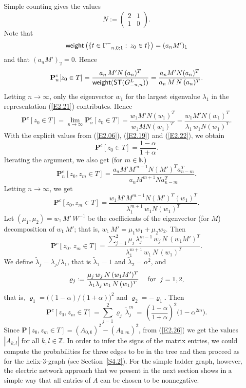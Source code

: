 \documentclass[11pt]{article}
\providecommand{\1}{\mathBB{1}}
\newcommand{\mf}{\quad\mbox{\;for \;}}
\renewcommand{\P}{\mathbf{P}}
\newcommand{\N}{{\mathbb{N}}}
\newcommand{\Z}{{\mathbb{Z}}}
\newcommand{\equ}[1]{(\ref{#1})}
\def\SPT{\mathsf{ST}}
\newcommand{\weight}{\mathop{\mbox{\sf weight}}}
\begin{document}
Simple counting gives the values
\begin{equation}
\label{E2.22}
N:=\left(\begin{array}{cc}
2&1\\
1&0
\end{array}\right).
\end{equation}
Note that
$$\weight\big(\{t\in\Gamma^-_{-n,0;1}:\,z_0\in t\}\big)=(a_{n}M')_1$$
and that $(a_{n}M')_2=0$.
Hence
\begin{equation}
\label{E2.23}
\P^c_n[z_0\in T]=\frac{a_{n}\,M'N\,(a_{n})^T}{\weight(\SPT(G^L_{-n,n}))}
=\frac{a_{n}M'N(a_{n})^T}{a_{n}\,M\,N\,(a_{n})^T}.
\end{equation}
Letting $n\to\infty$, only the eigenvector $w_1$ for the largest eigenvalue $\lambda_1$ in the representation \equ{E2.21} contributes. Hence
\begin{equation}
\label{E2.24}
\P^c[z_0\in T]=\lim_{n\to\infty}\P^c_n[z_0\in T]=\frac{w_1M'N(w_1)^T}{w_1MN(w_1)^T}
=\frac{w_1M'N(w_1)^T}{\lambda_1\,w_1N(w_1)^T}.
\end{equation}
With the explicit values from \equ{E2.06}, \equ{E2.19} and \equ{E2.22}, we obtain
$$\P^c[z_0 \in T]=\frac{1-\alpha}{1+\alpha}.$$
Iterating the argument, we also get (for $m\in \N$)
$$\P^c_n[z_0,z_m\in T]=\frac{a_{n}M'M^{m-1}N(M')^Ta_{n-m}^T}{a_{n}M^{m+1}Na_{n-m}^T}.$$
Letting $n\to\infty$, we get
\begin{equation}
\label{E2.25}
\P^c[z_0,z_m\in T]=\frac{w_1M'M^{m-1}N(M')^T(w_1)^T}{\lambda_1^{m+1}\,w_1N(w_1)^T}.
\end{equation}
Let $(\mu_1,\mu_2)=w_1\,M'\,W^{-1}$
be the coefficients of the eigenvector (for $M$) decomposition of $w_1\,M'$; that is, $w_1\,M'=\mu_1w_1+\mu_2w_2$. Then
$$\P^c[z_0,\,z_m\in T]=\frac{\sum_{j=1}^2\mu_j\,\lambda_j^{m-1}\,w_j\,N\,(w_1M')^T}{\lambda_1^{m+1}\,w_1\,N\,(w_1)^T}.$$
We define
$\tilde\lambda_j=\lambda_j/\lambda_1$, that is $\tilde\lambda_1=1$ and $\tilde\lambda_2=\alpha^2$, and
$$\varrho_j:=\frac{\mu_j\,w_j\,N\,(w_1M')^T}{\lambda_1\lambda_j\,w_1\,N\,(w_1)^T}\mf j=1,2,$$
that is, $\varrho_1=\big((1-\alpha)/(1+\alpha)\big)^2$ and $\varrho_2=-\varrho_1$.
Then
\begin{equation}
\label{E2.26}
\P^c[z_0,z_m\in T]=\sum_{j=1}^2\varrho_j\,\tilde\lambda_j^m\,=\,\left(\frac{1-\alpha}{1+\alpha}\right)^2\big(1-\alpha^{2m}\big).
\end{equation}
Since $\P[z_0,z_m\in T]=(A_{0,0})^2-(A_{0,m})^2$, from \equ{E2.26} we get the values $|A_{k,l}|$ for all $k,l\in\Z$. In order to infer the signs of the matrix entries, we could compute the probabilities for three edges to be in the tree and then proceed as for the helix-3-graph (see Section~\ref{S4.2}). For the simple ladder graph, however, the electric network approach that we present in the next section shows in a simple way that all entries of $A$ can be chosen to be nonnegative.
\end{document}
